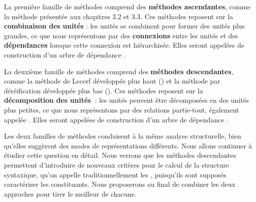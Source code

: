 La première famille de méthodes comprend des \textbf{méthodes ascendantes}, comme la méthode présentée aux chapitres 3.2 et 3.3. Ces méthodes reposent sur la \textbf{combinaison des unités} : les unités se combinent pour former des unités plus grandes, ce que nous représentons par des \textbf{connexions} entre les unités et des \textbf{dépendances} lorsque cette connexion est hiérarchisée. Elles seront appelées  de construction d’un arbre de dépendance .

La deuxième famille de méthodes comprend des \textbf{méthodes descendantes}, comme la méthode de Lecerf développée plus haut () et la méthode par déréification développée plus bas (). Ces méthodes reposent sur la \textbf{décomposition des unités~}: les unités peuvent être décomposées en des unités plus petites, ce que nous représentons par des relations partie-tout, également appelée . Elles seront appelées  de construction d’un arbre de dépendance .

Les deux familles de méthodes conduisent à la même analyse structurelle, bien qu’elles suggèrent des modes de représentations différents. Nous allons continuer à étudier cette question en détail. Nous verrons que les méthodes descendantes permettent d’introduire de nouveaux critères pour le calcul de la structure syntaxique, qu’on appelle traditionnellement les , puisqu’ils sont supposés caractériser les constituants. Nous proposerons au final de combiner les deux approches pour tirer le meilleur de chacune.

